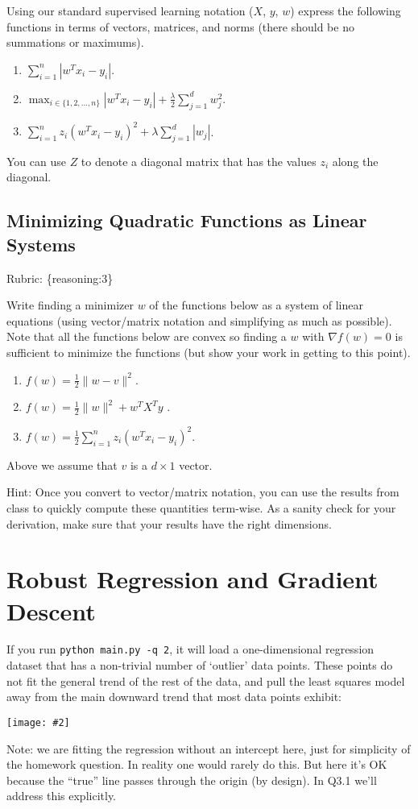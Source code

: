 \documentclass{article}
\def\rubric#1{\gre{Rubric: \{#1\}}}{}
\def\blu#1{{\color{blu}#1}}
\def\gre#1{{\color{gre}#1}}
\def\norm#1{\|#1\|}
\newcommand{\centerfig}[2]{\begin{center}\texttt{[image: \#2]}\end{center}}
\def\enum#1{\begin{enumerate}#1\end{enumerate}}
\begin{document}
Using our standard supervised learning notation ($X$, $y$, $w$)
express the following functions in terms of vectors, matrices, and norms (there should be no summations or maximums).
\blu{\enum{
\item $\sum_{i=1}^n |w^Tx_i - y_i|$.
\item $\max_{i \in \{1,2,\dots,n\}} |w^Tx_i  - y_i| + \frac{\lambda}{2}\sum_{j=1}^d w_j^2$.
\item $\sum_{i=1}^n z_i (w^Tx_i - y_i)^2 + \lambda \sum_{j=1}^{d} |w_j|$.
}}
You can use $Z$ to denote a diagonal matrix that has the values $z_i$ along the diagonal.


\subsection{Minimizing Quadratic Functions as Linear Systems}
\rubric{reasoning:3}

Write finding a minimizer $w$ of the functions below as a system of linear equations (using vector/matrix notation and simplifying as much as possible). Note that all the functions below are convex  so finding a $w$ with $\nabla f(w) = 0$ is sufficient to minimize the functions (but show your work in getting to this point).
\blu{\enum{
\item $f(w) = \frac{1}{2}\norm{w-v}^2$.
\item $f(w) = \frac{1}{2}\norm{w}^2 + w^TX^Ty$ .
\item $f(w) = \frac{1}{2}\sum_{i=1}^n z_i (w^Tx_i - y_i)^2$.
}}
Above we assume that $v$ is a $d \times 1$ vector. 

Hint: Once you convert to vector/matrix notation, you can use the results from class to quickly compute these quantities term-wise.
As a sanity check for your derivation, make sure that your results have the right dimensions.


\section{Robust Regression and Gradient Descent}

If you run \verb|python main.py -q 2|, it will load a one-dimensional regression
dataset that has a non-trivial number of `outlier' data points.
These points do not fit the general trend of the rest of the data,
and pull the least squares model away from the main downward trend that most data points exhibit:
\centerfig{.7}{../figs/least_squares_outliers.pdf}

Note: we are fitting the regression without an intercept here, just for simplicity of the homework question.
In reality one would rarely do this. But here it's OK because the ``true'' line 
passes through the origin (by design). In Q3.1 we'll address this explicitly.
\end{document}
